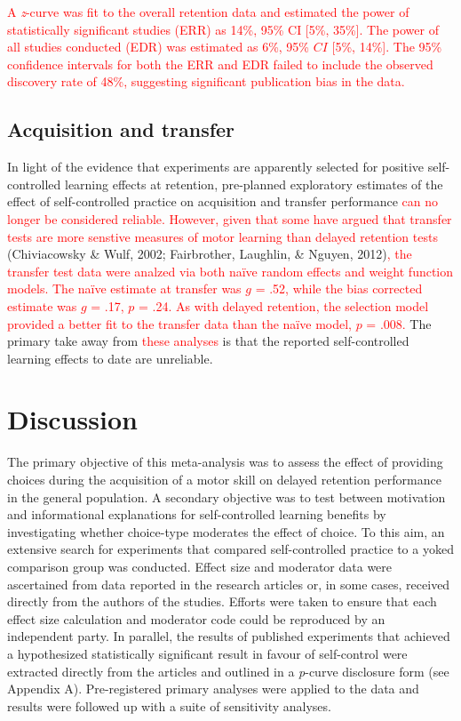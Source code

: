 \documentclass[
  english,
  man,floatsintext]{apa7}
\begin{document}
\textcolor{red}{A \emph{z}-curve was fit to the overall retention data and estimated the power of statistically significant studies (ERR) as 14\%, 95\% CI [5\%, 35\%]. The power of all studies conducted (EDR) was estimated as 6\%, 95\% $CI$ [5\%, 14\%]. The 95\% confidence intervals for both the ERR and EDR failed to include the observed discovery rate of 48\%, suggesting significant publication bias in the data.}

\hypertarget{acquisition-and-transfer}{%
\subsection{Acquisition and transfer}\label{acquisition-and-transfer}}

In light of the evidence that experiments are apparently selected for positive self-controlled learning effects at retention, pre-planned exploratory estimates of the effect of self-controlled practice on acquisition and transfer performance \textcolor{red}{can no longer be considered reliable. However, given that some have argued that transfer tests are more senstive measures of motor learning than delayed retention tests} (Chiviacowsky \& Wulf, 2002; Fairbrother, Laughlin, \& Nguyen, 2012)\textcolor{red}{, the transfer test data were analzed via both naïve random effects and weight function models. The naïve estimate at transfer was $g$ = .52, while the bias corrected estimate was $g$ = .17, $p$ = .24. As with delayed retention, the selection model provided a better fit to the transfer data than the naïve model, $p$ = .008.} The primary take away from \textcolor{red}{these analyses} is that the reported self-controlled learning effects to date are unreliable.

\hypertarget{discussion}{%
\section{Discussion}\label{discussion}}

The primary objective of this meta-analysis was to assess the effect of providing choices during the acquisition of a motor skill on delayed retention performance in the general population. A secondary objective was to test between motivation and informational explanations for self-controlled learning benefits by investigating whether choice-type moderates the effect of choice. To this aim, an extensive search for experiments that compared self-controlled practice to a yoked comparison group was conducted. Effect size and moderator data were ascertained from data reported in the research articles or, in some cases, received directly from the authors of the studies. Efforts were taken to ensure that each effect size calculation and moderator code could be reproduced by an independent party. In parallel, the results of published experiments that achieved a hypothesized statistically significant result in favour of self-control were extracted directly from the articles and outlined in a \emph{p}-curve disclosure form (see Appendix A). Pre-registered primary analyses were applied to the data and results were followed up with a suite of sensitivity analyses.
\end{document}
